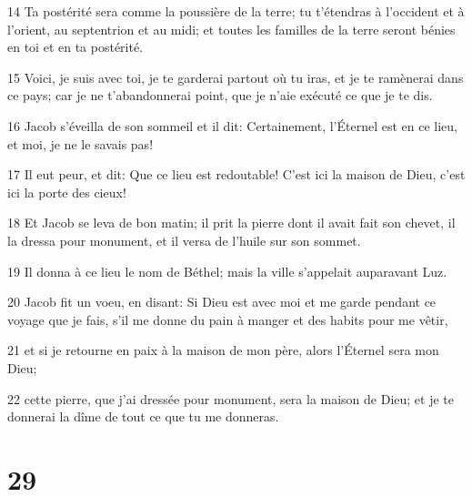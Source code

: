 \par 14 Ta postérité sera comme la poussière de la terre; tu t'étendras à l'occident et à l'orient, au septentrion et au midi; et toutes les familles de la terre seront bénies en toi et en ta postérité.
\par 15 Voici, je suis avec toi, je te garderai partout où tu iras, et je te ramènerai dans ce pays; car je ne t'abandonnerai point, que je n'aie exécuté ce que je te dis.
\par 16 Jacob s'éveilla de son sommeil et il dit: Certainement, l'Éternel est en ce lieu, et moi, je ne le savais pas!
\par 17 Il eut peur, et dit: Que ce lieu est redoutable! C'est ici la maison de Dieu, c'est ici la porte des cieux!
\par 18 Et Jacob se leva de bon matin; il prit la pierre dont il avait fait son chevet, il la dressa pour monument, et il versa de l'huile sur son sommet.
\par 19 Il donna à ce lieu le nom de Béthel; mais la ville s'appelait auparavant Luz.
\par 20 Jacob fit un voeu, en disant: Si Dieu est avec moi et me garde pendant ce voyage que je fais, s'il me donne du pain à manger et des habits pour me vêtir,
\par 21 et si je retourne en paix à la maison de mon père, alors l'Éternel sera mon Dieu;
\par 22 cette pierre, que j'ai dressée pour monument, sera la maison de Dieu; et je te donnerai la dîme de tout ce que tu me donneras.

\chapter{29}

